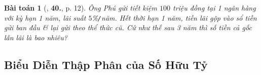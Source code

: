 \documentclass{article}
\numberwithin{equation}{section}
\newtheorem{baitoan}{Bài toán}[section]
\begin{document}
\begin{baitoan}[\cite{Tuyen_Toan_7}, \textbf{40.}, p. 12]
	Ông Phú gửi tiết kiệm $100$ triệu đồng tại 1 ngân hàng với kỳ hạn 1 năm, lãi suất $5$\%\emph{\texttt{/}}năm. Hết thời hạn 1 năm, tiền lãi gộp vào sổ tiền gửi ban đầu \& lại gửi theo thể thức cũ. Cứ như thế sau 3 năm thì số tiền cả gốc lẫn lãi là bao nhiêu?
\end{baitoan}


\subsection{Biểu Diễn Thập Phân của Số Hữu Tỷ}


\printbibliography[heading=bibintoc]
	
\end{document}
